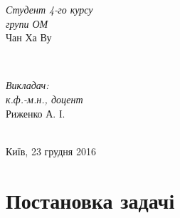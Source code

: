 \begin{titlepage}
\begin{minipage}{0.4\textwidth}
\begin{flushleft} \large
\emph{Студент 4-го курсу}\\
\emph{групи ОМ}\\
Чан Ха Ву %
\end{flushleft}
\end{minipage}
~
\begin{minipage}{0.4\textwidth}
\begin{flushright} \large
\emph{Викладач:} \\
\emph{к.ф.-м.н., доцент} \\
Риженко \textsc{А. І.} %
\end{flushright}
\end{minipage}\\[4cm]



{\large Київ, 23 грудня 2016}\\[3cm] %


 

\vfill %
\end{titlepage}

\section{Постановка задачі}

